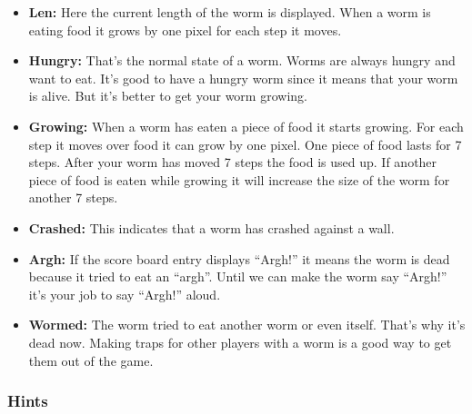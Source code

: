 \begin{itemize}
\item \textbf{Len:}
Here the current length of the worm is displayed. When a worm is eating
food it grows by one pixel for each step it moves. 

\item \textbf{Hungry:}
That's the normal state of a worm. Worms are always
hungry and want to eat. It's good to have a hungry
worm since it means that your worm is alive. But it's
better to get your worm growing. 

\item \textbf{Growing:}
When a worm has eaten a piece of food it starts growing. For each step
it moves over food it can grow by one pixel. One piece of food lasts
for 7 steps. After your worm has moved 7 steps the food is used up. If
another piece of food is eaten while growing it will increase the size
of the worm for another 7 steps. 

\item \textbf{Crashed:}
This indicates that a worm has crashed against a wall.

\item \textbf{Argh:}
If the score board entry displays ``Argh!'' it
means the worm is dead because it tried to eat an ``argh''. Until we
can make the worm say ``Argh!'' it's your job to say ``Argh!'' aloud.

\item \textbf{Wormed:}
The worm tried to eat another worm or even itself.
That's why it's dead now.  Making traps for other players with a worm is a good way to get them out of the game.
\end{itemize}


\subsubsection{Hints}

